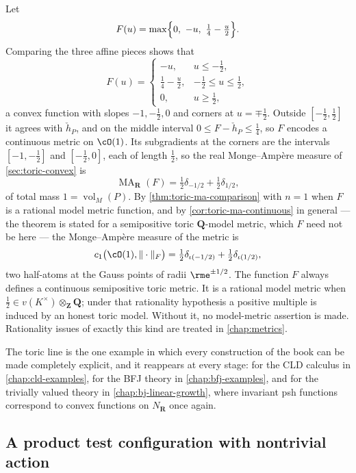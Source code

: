 \begin{example}
\label{ex:ch01-toric-two-breaks}
Let
\[
   F(u)=\max\Bigl\{0,\ -u,\ \tfrac14-\tfrac{u}{2}\Bigr\}.
\]
Comparing the three affine pieces shows that
\[
 F(u)=
 \begin{cases}
  -u,& u\leq-\tfrac12,\\[1mm]
  \tfrac14-\tfrac u2,& -\tfrac12\leq u\leq\tfrac12,\\[1mm]
  0,& u\geq\tfrac12,
 \end{cases}
\]
a convex function with slopes $-1,-\tfrac12,0$ and corners at
$u=\mp\tfrac12$.  Outside $[-\tfrac12,\tfrac12]$ it agrees with
$\check h_P$, and on the middle interval
$0\leq F-\check h_P\leq\tfrac14$, so $F$ encodes a continuous metric on
$\cO(1)$.  Its subgradients at the corners are the intervals
$[-1,-\tfrac12]$ and $[-\tfrac12,0]$, each of length $\tfrac12$, so the real
Monge--Amp\`ere measure of \cref{sec:toric-convex} is
\[
 \operatorname{MA}_{\mathbf R}(F)
 =\tfrac12\delta_{-1/2}+\tfrac12\delta_{1/2},
\]
of total mass $1=\operatorname{vol}_M(P)$.  By
\cref{thm:toric-ma-comparison} with $n=1$ when $F$ is a rational model
metric function, and by \cref{cor:toric-ma-continuous} in general --- the
theorem is stated for a semipositive toric $\mathbf Q$-model metric, which
$F$ need not be here --- the Monge--Amp\`ere measure of the metric is
\[
 c_1\bigl(\cO(1),\|\cdot\|_F\bigr)
 =\tfrac12\delta_{\iota(-1/2)}+\tfrac12\delta_{\iota(1/2)},
\]
two half-atoms at the Gauss points of radii $\rme^{\pm1/2}$.  The function
$F$ always defines a continuous semipositive toric metric.  It is a rational
model metric when
$\tfrac12\in v(K^\times)\otimes_{\mathbf Z}\mathbf Q$; under that
rationality hypothesis a positive multiple is induced by an honest toric
model.  Without it, no model-metric assertion is made.  Rationality issues
of exactly this kind are treated in \cref{chap:metrics}.
\end{example}

The toric line is the one example in which every construction of the book
can be made completely explicit, and it reappears at every stage: for the
CLD calculus in \cref{chap:cld-examples}, for the BFJ theory in
\cref{chap:bfj-examples}, and for the trivially valued theory in
\cref{chap:bj-linear-growth}, where invariant psh functions correspond to
convex functions on $N_{\mathbf R}$ once again.

\subsection{A product test configuration with nontrivial action}
\label{sec:ch01-running-tc}

